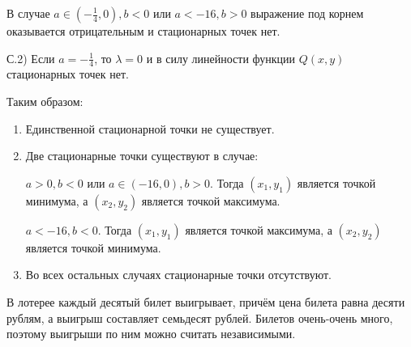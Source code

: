 \documentclass[addpoints, answers]{exam} %
\begin{document}
\begin{questions}
\begin{solution}
В случае $a\in \left(-\frac{1}{4} ,0\right),b<0$ или $a<-16,b>0$ выражение под корнем оказывается отрицательным и стационарных точек нет.

С.2) Если $a=-\frac{1}{4} $, то $\lambda =0$ и в силу линейности функции $Q(x,y)$ стационарных точек нет.



Таким образом:

\begin{enumerate}
\item  Единственной стационарной точки не существует.

\item  Две стационарные точки существуют в случае:


$a>0,b<0$ или $a\in \left(-16,0\right),b>0$. Тогда $\left(x_{1} ,y_{1} \right)$ является точкой минимума, а $\left(x_{2} ,y_{2} \right)$ является точкой максимума.

$a<-16,b<0$. Тогда $\left(x_{1} ,y_{1} \right)$ является точкой максимума, а $\left(x_{2} ,y_{2} \right)$ является точкой минимума.

\item Во всех остальных случаях стационарные точки отсутствуют.
\end{enumerate}



\end{solution}

\question В лотерее каждый десятый билет выигрывает, причём цена билета равна десяти рублям, а выигрыш составляет семьдесят рублей. Билетов очень-очень много, поэтому выигрыши по ним можно считать независимыми.
\end{questions}
\end{document}

